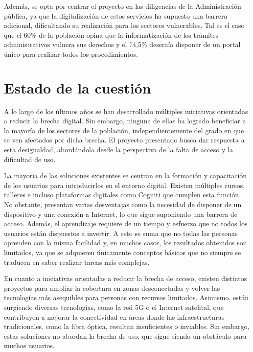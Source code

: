 \documentclass[12pt, a4paper, twoside]{report}
\begin{document}
        Además, se opta por centrar el proyecto en las diligencias de la Administración pública, ya que la digitalización de estos servicios ha supuesto una barrera adicional, dificultando su realización para los sectores vulnerables. 
        Tal es el caso que el 60\% de la población opina que la informatización de los trámites administrativos vulnera sus derechos y el 74,5\% deseraía disponer de un portal único para realizar todos los procedimientos. \cite{ref4}

    \section{Estado de la cuestión}
        A lo largo de los últimos años se han desarrollado múltiples iniciativas orientadas a reducir la brecha digital. 
        Sin embargo, ninguna de ellas ha logrado beneficiar a la mayoría de los sectores de la población, independientemente del grado en que se ven afectados por dicha brecha. 
        El proyecto presentado busca dar respuesta a esta desigualdad, abordándola desde la perspectiva de la falta de acceso y la dificultad de uso.

        La mayoría de las soluciones existentes se centran en la formación y capacitación de los usuarios para introducirlos en el entorno digital. 
        Existen múltiples cursos, talleres e incluso plataformas digitales como Cogniti que cumplen esta función. 
        No obstante, presentan varias desventajas como la necesidad de disponer de un dispositivo y una conexión a Internet, lo que sigue suponiendo una barrera de acceso. 
        Además, el aprendizaje requiere de un tiempo y esfuerzo que no todos los usuarios están dispuestos a invertir. 
        A esto se suma que no todas las personas aprenden con la misma facilidad y, en muchos casos, los resultados obtenidos son limitados, ya que se adquieren únicamente conceptos básicos que no siempre se traducen en saber realizar tareas más complejas.

        En cuanto a iniciativas orientadas a reducir la brecha de acceso, existen distintos proyectos para ampliar la cobertura en zonas desconectadas y volver las tecnologías más asequibles para personas con recursos limitados. 
        Asimismo, están surgiendo diversas tecnologías, como la red 5G o el Internet satelital, que contribuyen a mejorar la conectividad en áreas donde las infraestructuras tradicionales, como la fibra óptica, resultan insuficientes o inviables.
        Sin embargo, estas soluciones no abordan la brecha de uso, que sigue siendo un obstáculo para muchos usuarios.
\end{document}
